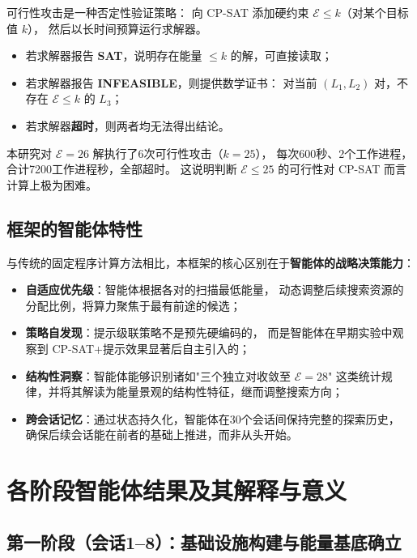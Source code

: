 \documentclass[11pt,a4paper]{ctexart}
\theoremstyle{remark}
\newcommand{\E}{\mathcal{E}}
\begin{document}
可行性攻击是一种否定性验证策略：
向 CP-SAT 添加硬约束 $\E \le k$（对某个目标值 $k$），
然后以长时间预算运行求解器。

\begin{itemize}
  \item 若求解器报告 \textbf{SAT}，说明存在能量 $\le k$ 的解，可直接读取；
  \item 若求解器报告 \textbf{INFEASIBLE}，则提供数学证书：
    对当前 $(L_1, L_2)$ 对，不存在 $\E \le k$ 的 $L_3$；
  \item 若求解器\textbf{超时}，则两者均无法得出结论。
\end{itemize}

本研究对 $\E = 26$ 解执行了6次可行性攻击（$k = 25$），
每次600秒、2个工作进程，合计7200工作进程秒，全部超时。
这说明判断 $\E \le 25$ 的可行性对 CP-SAT 而言计算上极为困难。

\subsection{框架的智能体特性}

与传统的固定程序计算方法相比，本框架的核心区别在于\textbf{智能体的战略决策能力}：

\begin{itemize}[leftmargin=2em]
  \item \textbf{自适应优先级}：智能体根据各对的扫描最低能量，
    动态调整后续搜索资源的分配比例，将算力聚焦于最有前途的候选；
  \item \textbf{策略自发现}：提示级联策略不是预先硬编码的，
    而是智能体在早期实验中观察到 CP-SAT+提示效果显著后自主引入的；
  \item \textbf{结构性洞察}：智能体能够识别诸如"三个独立对收敛至 $\E = 28$"
    这类统计规律，并将其解读为能量景观的结构性特征，继而调整搜索方向；
  \item \textbf{跨会话记忆}：通过状态持久化，智能体在30个会话间保持完整的探索历史，
    确保后续会话能在前者的基础上推进，而非从头开始。
\end{itemize}

\section{各阶段智能体结果及其解释与意义}
\label{sec:results}

\subsection{第一阶段（会话1--8）：基础设施构建与能量基底确立}
\end{document}
